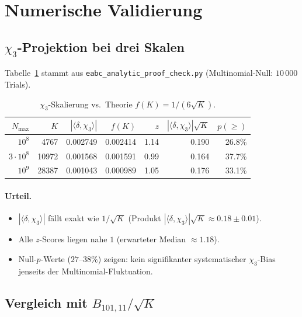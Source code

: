 \documentclass[11pt,a4paper]{article}
\begin{document}
\section{Numerische Validierung}

\subsection{$\chi_3$-Projektion bei drei Skalen}

Tabelle~\ref{tab:chi3} stammt aus \texttt{eabc\_analytic\_proof\_check.py}
(Multinomial-Null: $10\,000$ Trials).

\begin{table}[h]
\centering
\caption{$\chi_3$-Skalierung vs.\ Theorie $f(K)=1/(6\sqrt{K})$.}
\label{tab:chi3}
\begin{tabular}{rrrrrrr}
\toprule
$N_{\max}$ & $K$ & $|\langle\delta,\chi_3\rangle|$ & $f(K)$ & $z$ &
$|\langle\delta,\chi_3\rangle|\sqrt{K}$ & $p(\ge)$ \\
\midrule
$10^8$    & 4767  & 0.002749 & 0.002414 & 1.14 & 0.190 & 26.8\% \\
$3\cdot10^8$ & 10972 & 0.001568 & 0.001591 & 0.99 & 0.164 & 37.7\% \\
$10^9$    & 28387 & 0.001043 & 0.000989 & 1.05 & 0.176 & 33.1\% \\
\bottomrule
\end{tabular}
\end{table}

\paragraph{Urteil.}
\begin{itemize}
  \item $|\langle\delta,\chi_3\rangle|$ fällt exakt wie $1/\sqrt{K}$
        (Produkt $|\langle\delta,\chi_3\rangle|\sqrt{K}\approx 0.18\pm 0.01$).
  \item Alle $z$-Scores liegen nahe $1$ (erwarteter Median $\approx 1.18$).
  \item Null-$p$-Werte ($27$--$38\%$) zeigen: kein signifikanter
        systematischer $\chi_3$-Bias jenseits der Multinomial-Fluktuation.
\end{itemize}

\subsection{Vergleich mit $B_{101,11}/\sqrt{K}$}
\end{document}
